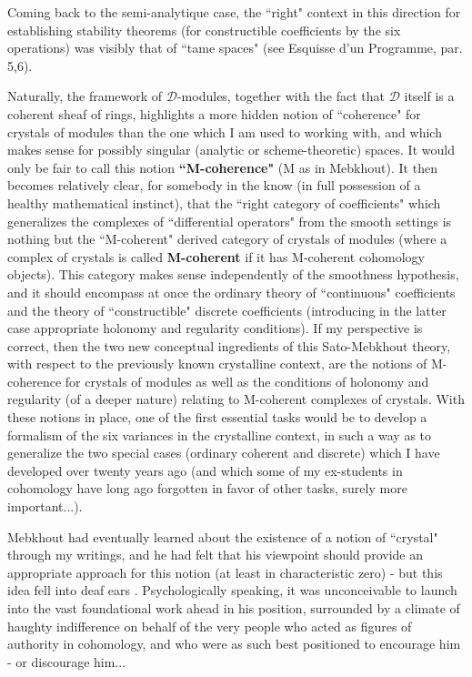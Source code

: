 Coming back to the semi-analytique case, the ``right" context in this direction for establishing stability theorems (for constructible coefficients by the six operations) was visibly that of ``tame spaces" (see Esquisse d'un Programme, par. 5,6).

\label{note:46.4}

Naturally, the framework of $\mathcal{D}$-modules, together with the fact that $\mathcal{D}$ itself is a coherent sheaf of rings, highlights a more hidden notion of ``coherence" for crystals of modules than the one which I am used to working with, and which makes sense for possibly singular (analytic or scheme-theoretic) spaces. It would only be fair to call this notion \textbf{``M-coherence"} (M as in Mebkhout). It then becomes relatively clear, for somebody in the know (in full possession of a healthy mathematical instinct), that the ``right category of coefficients" which generalizes the complexes of ``differential operators" from the smooth settings is nothing but the ``M-coherent" derived category of crystals of modules (where a complex of crystals is called \textbf{M-coherent} if it has M-coherent cohomology objects). This category makes sense independently of the smoothness hypothesis, and it should encompass at once the ordinary theory of ``continuous" coefficients and the theory of ``constructible" discrete coefficients (introducing in the latter case appropriate holonomy and regularity conditions). If my perspective is correct, then the two new conceptual ingredients of this Sato-Mebkhout theory, with respect to the previously known crystalline context, are the notions of M-coherence for crystals of modules as well as the conditions of holonomy and regularity (of a deeper nature) relating to M-coherent complexes of crystals. With these notions in place, one of the first essential tasks would be to develop a formalism of the six variances in the crystalline context, in such a way as to generalize the two special cases (ordinary coherent and discrete) which I have developed over twenty years ago (and which some of my ex-students in cohomology have long ago forgotten in favor of other tasks, surely more important...).

Mebkhout had eventually learned about the existence of a notion of ``crystal" through my writings, and he had felt that his viewpoint should provide an appropriate approach for this notion (at least in characteristic zero) - but this idea fell into deaf ears
. Psychologically speaking, it was unconceivable to launch into the vast foundational work ahead in his position, surrounded by a climate of haughty indifference on behalf of the very people who acted as figures of authority in cohomology, and who were as such best positioned to encourage him - or discourage him...

